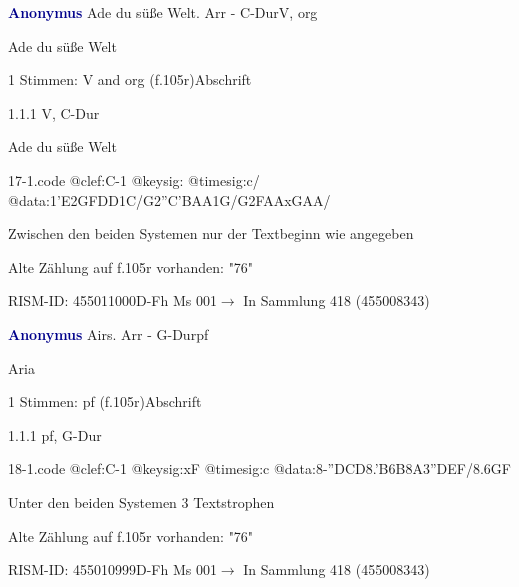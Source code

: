 \documentclass[twocolumn]{book}
\begin{document}
\par \vspace{7pt} \textcolor{darkblue}{\textbf{Anonymus  }}\hfillplus{\textbf{[17]}}\newline Ade du süße Welt. Arr - C-Dur\newline V, org
\par \begin{itshape} Ade du süße Welt\end{itshape} 
\par \textcolor{darkblue}{}  1 Stimmen: V and org  (f.105r)\newline Abschrift
\par 1.1.1  V, C-Dur\newline \begin{footnotesize} Ade du süße Welt \end{footnotesize}  
\begin{filecontents*}{17-1.code}
@clef:C-1
@keysig:
@timesig:c/
@data:1'E2GFDD1C/G2''C'BAA1G/G2FAAxGAA/
\end{filecontents*}
\newline
%
\par Zwischen den beiden Systemen nur der Textbeginn wie angegeben
\par Alte Zählung auf f.105r vorhanden: "76"
\par RISM-ID: 455011000\newline D-Fh  Ms 001\newline $\rightarrow$ In Sammlung 418 (455008343)
      
\par \vspace{7pt} \textcolor{darkblue}{\textbf{Anonymus  }}\hfillplus{\textbf{[18]}}\newline Airs. Arr - G-Dur\newline pf
\par \begin{itshape} Aria\end{itshape} 
\par \textcolor{darkblue}{}  1 Stimmen: pf  (f.105r)\newline Abschrift
\par 1.1.1  pf, G-Dur  
\begin{filecontents*}{18-1.code}
@clef:C-1
@keysig:xF
@timesig:c
@data:8-''D{CD}{8.'B6B}8A{3''DEF}/{8.6GF}
\end{filecontents*}
\newline
%
\par Unter den beiden Systemen 3 Textstrophen
\par Alte Zählung auf f.105r vorhanden: "76"
\par RISM-ID: 455010999\newline D-Fh  Ms 001\newline $\rightarrow$ In Sammlung 418 (455008343)
      
\end{document}
